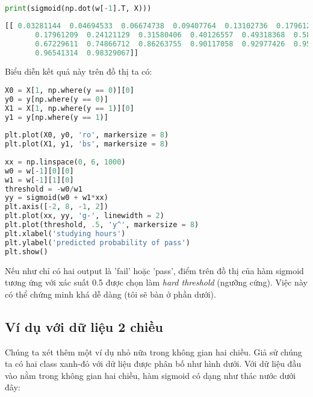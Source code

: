  
{%
 
\begin{lstlisting}[language=Python]
print(sigmoid(np.dot(w[-1].T, X))) 
\end{lstlisting}
 
\begin{lstlisting}[language=Python]
    [[ 0.03281144  0.04694533  0.06674738  0.09407764  0.13102736  0.17961209 
       0.17961209  0.24121129  0.31580406  0.40126557  0.49318368  0.58556493 
       0.67229611  0.74866712  0.86263755  0.90117058  0.92977426  0.95055357 
       0.96541314  0.98329067]] 
\end{lstlisting}
 
Biểu diễn kết quả này trên đồ thị ta có: 
 
 
\begin{lstlisting}[language=Python]
X0 = X[1, np.where(y == 0)][0] 
y0 = y[np.where(y == 0)] 
X1 = X[1, np.where(y == 1)][0] 
y1 = y[np.where(y == 1)] 
 
plt.plot(X0, y0, 'ro', markersize = 8) 
plt.plot(X1, y1, 'bs', markersize = 8) 
 
xx = np.linspace(0, 6, 1000) 
w0 = w[-1][0][0] 
w1 = w[-1][1][0] 
threshold = -w0/w1 
yy = sigmoid(w0 + w1*xx) 
plt.axis([-2, 8, -1, 2]) 
plt.plot(xx, yy, 'g-', linewidth = 2) 
plt.plot(threshold, .5, 'y^', markersize = 8) 
plt.xlabel('studying hours') 
plt.ylabel('predicted probability of pass') 
plt.show() 
\end{lstlisting}
 
 
 
 
 
Nếu như chỉ có hai output là 'fail' hoặc 'pass', điểm trên đồ thị của hàm sigmoid tương ứng với xác suất 0.5 được chọn làm \textit{hard threshold} (ngưỡng cứng). Việc này có thể chứng minh khá dễ dàng (tôi sẽ bàn ở phần dưới).  
 
 
\subsection{Ví dụ với dữ liệu 2 chiều}
Chúng ta xét thêm một ví dụ nhỏ nữa trong không gian hai chiều. Giả sử chúng ta có hai class xanh-đỏ với dữ liệu được phân bố như hình dưới.  
Với dữ liệu đầu vào nằm trong không gian hai chiều, hàm sigmoid có dạng như thác nước dưới đây: 
 
}
